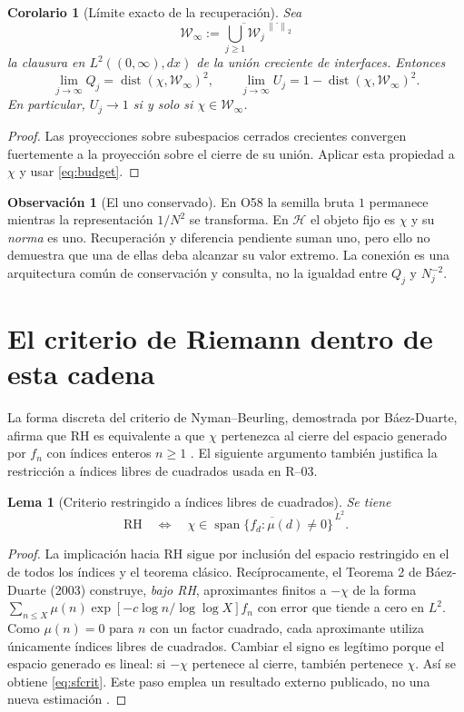 \documentclass[11pt,a4paper]{article}
\theoremstyle{mine}
\newtheorem{lema}[teorema]{Lema}
\newtheorem{corolario}[teorema]{Corolario}
\theoremstyle{definition}
\newtheorem{observacion}[teorema]{Observación}
\newcommand{\HH}{\mathcal H}
\newcommand{\WW}{\mathcal W}
\newcommand{\norm}[1]{\left\lVert#1\right\rVert}
\newcommand{\dist}{\operatorname{dist}}
\newcommand{\RH}{\mathrm{RH}}
\begin{document}
\begin{corolario}[Límite exacto de la recuperación]\label{co:closure}
Sea
\[
\WW_\infty:=\overline{\bigcup_{j\ge1}\WW_j}^{\,\norm{\cdot}_2}
\]
la clausura en $L^2((0,\infty),dx)$ de la unión creciente de interfaces. Entonces
\begin{equation}\label{eq:limit}
\boxed{\ \lim_{j\to\infty} Q_j=\dist(\chi,\WW_\infty)^2,\qquad
\lim_{j\to\infty}U_j=1-\dist(\chi,\WW_\infty)^2.\ }
\end{equation}
En particular, $U_j\to1$ si y solo si $\chi\in\WW_\infty$.
\end{corolario}
\begin{proof}
Las proyecciones sobre subespacios cerrados crecientes convergen fuertemente a la proyección sobre el cierre de su unión. Aplicar esta propiedad a $\chi$ y usar \eqref{eq:budget}.
\end{proof}

\begin{observacion}[El uno conservado]
En O58 la semilla bruta $1$ permanece mientras la representación $1/N^2$ se transforma. En $\HH$ el objeto fijo es $\chi$ y su \emph{norma} es uno. Recuperación y diferencia pendiente suman uno, pero ello no demuestra que una de ellas deba alcanzar su valor extremo. La conexión es una arquitectura común de conservación y consulta, no la igualdad entre $Q_j$ y $N_j^{-2}$.
\end{observacion}

\section{El criterio de Riemann dentro de esta cadena}

La forma discreta del criterio de Nyman--Beurling, demostrada por Báez-Duarte, afirma que RH es equivalente a que $\chi$ pertenezca al cierre del espacio generado por $f_n$ con índices enteros $n\ge1$ \cite{BD2003}. El siguiente argumento también justifica la restricción a índices libres de cuadrados usada en R--03.

\begin{lema}[Criterio restringido a índices libres de cuadrados]\label{le:squarefree}
Se tiene
\begin{equation}\label{eq:sfcrit}
\RH\quad\Longleftrightarrow\quad
\chi\in\overline{\operatorname{span}\{f_d:\mu(d)\ne0\}}^{\,L^2}.
\end{equation}
\end{lema}
\begin{proof}
La implicación hacia RH sigue por inclusión del espacio restringido en el de todos los índices y el teorema clásico. Recíprocamente, el Teorema 2 de Báez-Duarte (2003) construye, \emph{bajo RH}, aproximantes finitos a $-\chi$ de la forma
\(
\sum_{n\le X}\mu(n)\exp[-c\log n/\log\log X] f_n
\)
con error que tiende a cero en $L^2$. Como $\mu(n)=0$ para $n$ con un factor cuadrado, cada aproximante utiliza únicamente índices libres de cuadrados. Cambiar el signo es legítimo porque el espacio generado es lineal: si $-\chi$ pertenece al cierre, también pertenece $\chi$. Así se obtiene \eqref{eq:sfcrit}. Este paso emplea un resultado externo publicado, no una nueva estimación \cite[Teorema~2]{BD2003}.
\end{proof}
\end{document}
